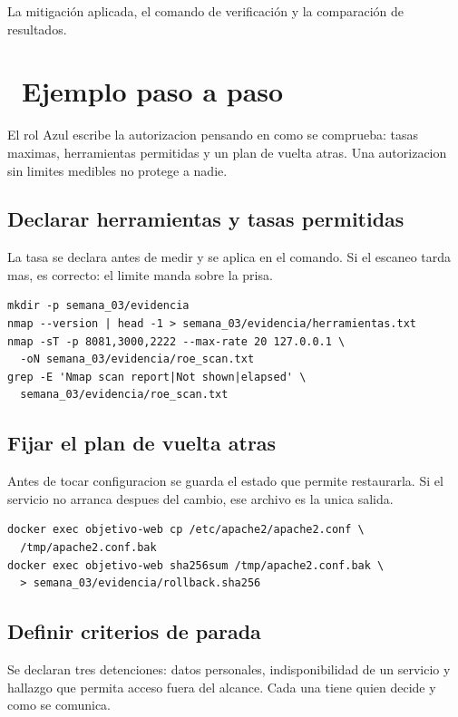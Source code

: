 \documentclass[11pt,a4paper]{article}
\newcommand{\iconotexto}[2]{\textcolor{cyanNeon}{\faIcon{#1}}~#2}
\begin{document}
La mitigación aplicada, el comando de verificación y la comparación de resultados.

\section{\iconotexto{list-ol}{Ejemplo paso a paso}}

El rol Azul escribe la autorizacion pensando en como se comprueba: tasas maximas, herramientas permitidas y un plan de vuelta atras. Una autorizacion sin limites medibles no protege a nadie.

\subsection{Declarar herramientas y tasas permitidas}

La tasa se declara antes de medir y se aplica en el comando. Si el escaneo tarda mas, es correcto: el limite manda sobre la prisa.

\begin{lstlisting}[style=estiloCodigo]
mkdir -p semana_03/evidencia
nmap --version | head -1 > semana_03/evidencia/herramientas.txt
nmap -sT -p 8081,3000,2222 --max-rate 20 127.0.0.1 \
  -oN semana_03/evidencia/roe_scan.txt
grep -E 'Nmap scan report|Not shown|elapsed' \
  semana_03/evidencia/roe_scan.txt
\end{lstlisting}

\subsection{Fijar el plan de vuelta atras}

Antes de tocar configuracion se guarda el estado que permite restaurarla. Si el servicio no arranca despues del cambio, ese archivo es la unica salida.

\begin{lstlisting}[style=estiloCodigo]
docker exec objetivo-web cp /etc/apache2/apache2.conf \
  /tmp/apache2.conf.bak
docker exec objetivo-web sha256sum /tmp/apache2.conf.bak \
  > semana_03/evidencia/rollback.sha256
\end{lstlisting}

\subsection{Definir criterios de parada}

Se declaran tres detenciones: datos personales, indisponibilidad de un servicio y hallazgo que permita acceso fuera del alcance. Cada una tiene quien decide y como se comunica.
\end{document}
